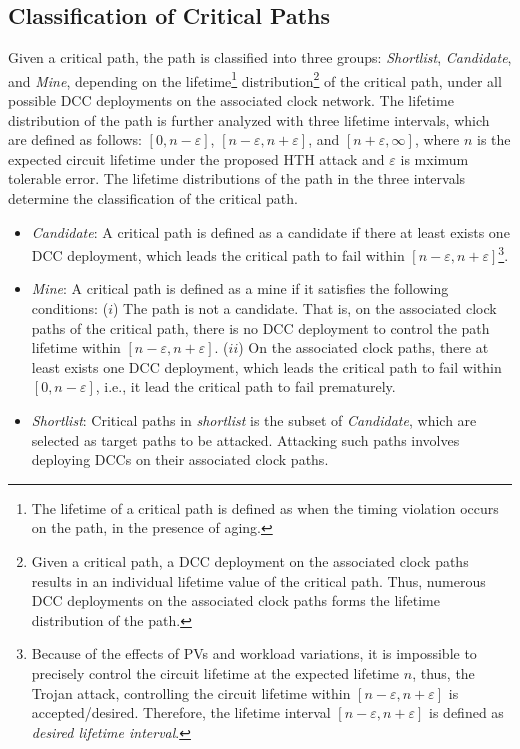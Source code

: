 \subsection{Classification of Critical Paths}
\label{sec:frame:cp}
Given a critical path, the path is classified into three groups: \textit{Shortlist}, \textit{Candidate}, and \textit{Mine}, depending on the lifetime\footnote{The lifetime of a critical path is defined as when the timing violation occurs on the path, in the presence of aging.} distribution\footnote{Given a critical path, a DCC deployment on the associated clock paths results in an individual lifetime value of the critical path. Thus, numerous DCC deployments on the associated clock paths forms the lifetime distribution of the path.} of the critical path, under all possible DCC deployments on the associated clock network. The lifetime distribution of the path is further analyzed with three lifetime intervals, which are defined as follows: $[0, n - \varepsilon]$, $[n - \varepsilon, n + \varepsilon]$, and $[n + \varepsilon, \infty]$, where $n$ is the expected circuit lifetime under the proposed HTH attack and $\varepsilon$ is mximum tolerable error. The lifetime distributions of the path in the three intervals determine the classification of the critical path. 
\begin{itemize}
	\item \textit{Candidate}: A critical path is defined as a candidate if there at least exists one DCC deployment, which leads the critical path to fail within $[n - \varepsilon, n + \varepsilon]$\footnote{Because of the effects of PVs and workload variations, it is impossible to precisely control the circuit lifetime at the expected lifetime $n$, thus, the Trojan attack, controlling the circuit lifetime within $[n - \varepsilon, n + \varepsilon]$ is accepted/desired. Therefore, the lifetime interval $[n - \varepsilon, n + \varepsilon]$ is defined as \textit{desired lifetime interval}.}.
	\item \textit{Mine}: A critical path is defined as a mine if it satisfies the following conditions: ($i$) The path is not a candidate. That is, on the associated clock paths of the critical path, there is no DCC deployment to control the path lifetime within $[n - \varepsilon, n + \varepsilon]$. ($ii$) On the associated clock paths, there at least exists one DCC deployment, which leads the critical path to fail within $[0, n - \varepsilon]$, i.e., it lead the critical path to fail prematurely.
	\item \textit{Shortlist}:  Critical paths in \textit{shortlist} is the subset of \textit{Candidate}, which are selected as target paths to be attacked. Attacking such paths involves deploying DCCs on their associated clock paths.
\end{itemize}

